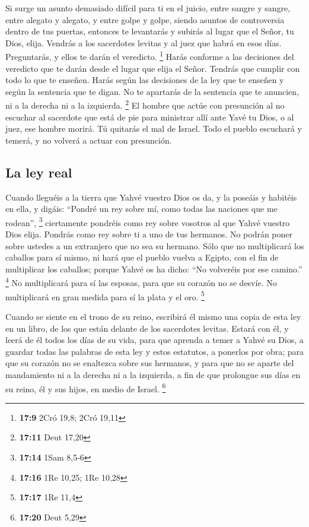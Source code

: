  Si surge un asunto demasiado difícil para ti en el
juicio, entre sangre y sangre, entre alegato y alegato, y entre golpe y
golpe, siendo asuntos de controversia dentro de tus puertas, entonces te
levantarás y subirás al lugar que el Señor, tu Dios, elija.
 Vendrás a los sacerdotes levitas y al juez que habrá en
esos días. Preguntarás, y ellos te darán el veredicto. \footnote{\textbf{17:9}
  2Cró 19,8; 2Cró 19,11}  Harás conforme a las decisiones
del veredicto que te darán desde el lugar que elija el Señor. Tendrás
que cumplir con todo lo que te enseñen.  Harás según las
decisiones de la ley que te enseñen y según la sentencia que te digan.
No te apartarás de la sentencia que te anuncien, ni a la derecha ni a la
izquierda. \footnote{\textbf{17:11} Deut 17,20}  El
hombre que actúe con presunción al no escuchar al sacerdote que está de
pie para ministrar allí ante Yavé tu Dios, o al juez, ese hombre morirá.
Tú quitarás el mal de Israel.  Todo el pueblo escuchará y
temerá, y no volverá a actuar con presunción.

\hypertarget{la-ley-real}{%
\subsection{La ley real}\label{la-ley-real}}

 Cuando lleguéis a la tierra que Yahvé vuestro Dios os
da, y la poseáis y habitéis en ella, y digáis: ``Pondré un rey sobre mí,
como todas las naciones que me rodean'', \footnote{\textbf{17:14} 1Sam
  8,5-6}  ciertamente pondréis como rey sobre vosotros al
que Yahvé vuestro Dios elija. Pondrás como rey sobre ti a uno de tus
hermanos. No podrán poner sobre ustedes a un extranjero que no sea su
hermano.  Sólo que no multiplicará los caballos para sí
mismo, ni hará que el pueblo vuelva a Egipto, con el fin de multiplicar
los caballos; porque Yahvé os ha dicho: ``No volveréis por ese camino.''
\footnote{\textbf{17:16} 1Re 10,25; 1Re 10,28}  No
multiplicará para sí las esposas, para que su corazón no se desvíe. No
multiplicará en gran medida para sí la plata y el oro. \footnote{\textbf{17:17}
  1Re 11,4}

 Cuando se siente en el trono de su reino, escribirá él
mismo una copia de esta ley en un libro, de los que están delante de los
sacerdotes levitas.  Estará con él, y leerá de él todos
los días de su vida, para que aprenda a temer a Yahvé su Dios, a guardar
todas las palabras de esta ley y estos estatutos, a ponerlos por obra;
 para que su corazón no se enaltezca sobre sus hermanos,
y para que no se aparte del mandamiento ni a la derecha ni a la
izquierda, a fin de que prolongue sus días en su reino, él y sus hijos,
en medio de Israel. \footnote{\textbf{17:20} Deut 5,29}

